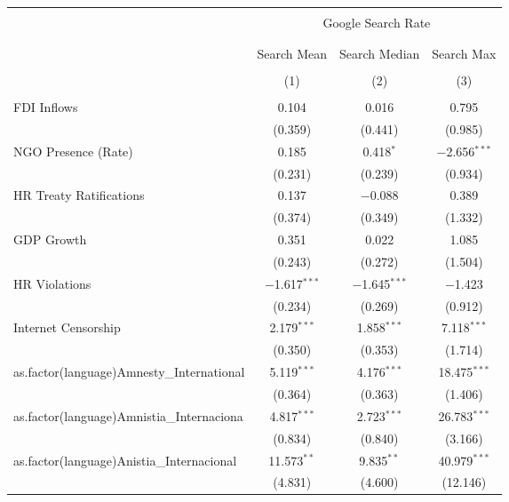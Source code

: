 
\begin{table}[!htbp] \centering 
  \caption{} 
  \label{} 
\begin{tabular}{@{\extracolsep{5pt}}lccc} 
\\[-1.8ex]\hline 
\hline \\[-1.8ex] 
 & \multicolumn{3}{c}{Google Search Rate} \\ 
\cline{2-4} 
\\[-1.8ex] & \multicolumn{3}{c}{ } \\ 
 & Search Mean & Search Median & Search Max \\ 
\\[-1.8ex] & (1) & (2) & (3)\\ 
\hline \\[-1.8ex] 
 FDI Inflows & 0.104 & 0.016 & 0.795 \\ 
  & (0.359) & (0.441) & (0.985) \\ 
  NGO Presence (Rate) & 0.185 & 0.418$^{*}$ & $-$2.656$^{***}$ \\ 
  & (0.231) & (0.239) & (0.934) \\ 
  HR Treaty Ratifications & 0.137 & $-$0.088 & 0.389 \\ 
  & (0.374) & (0.349) & (1.332) \\ 
  GDP Growth & 0.351 & 0.022 & 1.085 \\ 
  & (0.243) & (0.272) & (1.504) \\ 
  HR Violations & $-$1.617$^{***}$ & $-$1.645$^{***}$ & $-$1.423 \\ 
  & (0.234) & (0.269) & (0.912) \\ 
  Internet Censorship & 2.179$^{***}$ & 1.858$^{***}$ & 7.118$^{***}$ \\ 
  & (0.350) & (0.353) & (1.714) \\ 
  as.factor(language)Amnesty\_International & 5.119$^{***}$ & 4.176$^{***}$ & 18.475$^{***}$ \\ 
  & (0.364) & (0.363) & (1.406) \\ 
  as.factor(language)Amnistia\_Internaciona & 4.817$^{***}$ & 2.723$^{***}$ & 26.783$^{***}$ \\ 
  & (0.834) & (0.840) & (3.166) \\ 
  as.factor(language)Anistia\_Internacional & 11.573$^{**}$ & 9.835$^{**}$ & 40.979$^{***}$ \\ 
  & (4.831) & (4.600) & (12.146) \\ 

\end{tabular}
\end{table}
